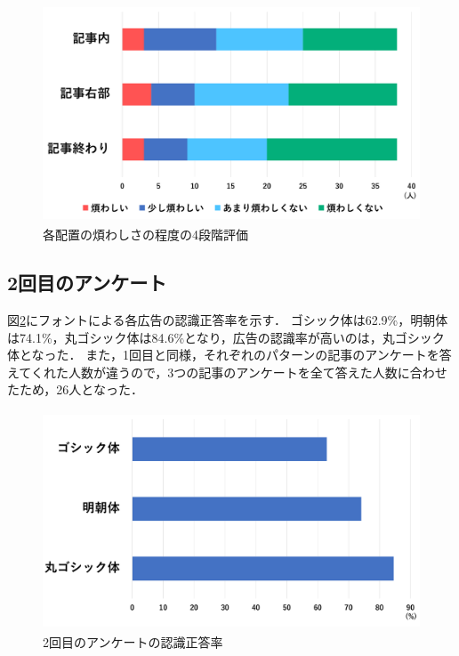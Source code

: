 \documentclass[12pt,a4j,titlepage]{ltjsarticle}
\begin{document}
\begin{figure}[h]
\begin{center}
 \includegraphics[height=65mm]{figures/煩わしさ_1.pdf}
\end{center}
 \caption{各配置の煩わしさの程度の4段階評価}
 \label{fig:煩わしさ_1}
\end{figure}

\subsection{2回目のアンケート}
図\ref{fig:広告認識正答率_2}にフォントによる各広告の認識正答率を示す．
ゴシック体は62.9\%，明朝体は74.1\%，丸ゴシック体は84.6\%となり，広告の認識率が高いのは，丸ゴシック体となった．
また，1回目と同様，それぞれのパターンの記事のアンケートを答えてくれた人数が違うので，3つの記事のアンケートを全て答えた人数に合わせたため，26人となった．

\begin{figure}[h]
\begin{center}
 \includegraphics[height=65mm]{figures/広告認識正答率_2.pdf}
\end{center}
 \caption{2回目のアンケートの認識正答率}
 \label{fig:広告認識正答率_2}
\end{figure}
\end{document}
